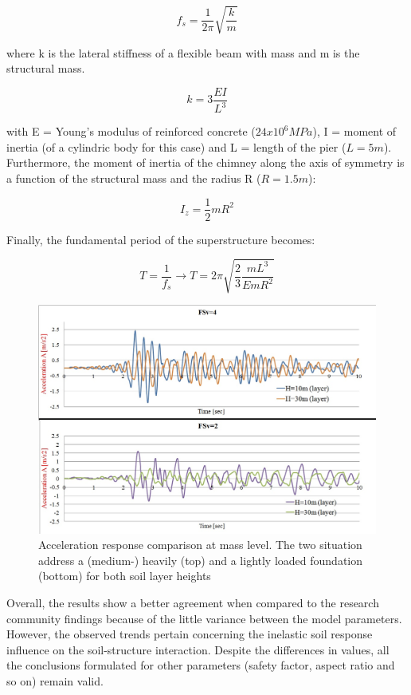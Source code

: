 \begin{equation}
	f_s=\frac{1}{2 \pi} \sqrt{\frac{k}{m}}
\end{equation}

where k is the lateral stiffness of a flexible beam with mass and m is the structural mass.

\begin{equation}
	k=3\frac{EI}{L^3}
\end{equation}

with E = Young's modulus of reinforced concrete ($24x10^6 MPa$), I = moment of inertia (of a cylindric body for this case) and L = length of the pier ($L=5m$). Furthermore, the moment of inertia of the chimney along the axis of symmetry is a function of the structural mass and the radius R ($R=1.5m$):
 
\begin{equation}
	I_z=\frac{1}{2}m R^2
\end{equation}

Finally, the fundamental period of the superstructure becomes:

\begin{equation}
	T=\frac{1}{f_s} \longrightarrow T=2\pi \sqrt{\frac{2}{3} \frac{m L^3}{E mR^2}}
\end{equation}

 \begin{figure}[h]
 	\centering
 	\includegraphics[width=0.7 \linewidth]{"acc_10m"}
 	\caption{Acceleration response comparison at mass level. The two situation address a (medium-) heavily (top) and a lightly loaded foundation (bottom) for both soil layer heights}
 	\label{10}
 \end{figure}

Overall, the results show a better agreement when compared to the research community findings because of the little variance between the model parameters. However, the observed trends pertain concerning the inelastic soil response influence on the soil-structure interaction. Despite the differences in values, all the conclusions formulated for other parameters (safety factor, aspect ratio and so on) remain valid.

